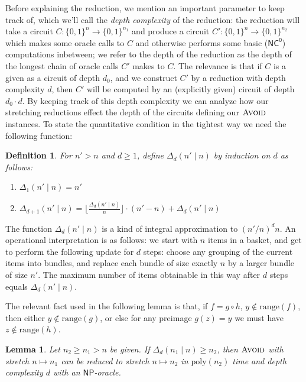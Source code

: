 \documentclass[11pt]{article}
\newtheorem{lemma}{Lemma}
\newtheorem{definition}{Definition}
\newcommand{\B}{\{0,1\}}
\newcommand{\poly}{\mathrm{poly}}
\newcommand{\avoid}{\textsc{Avoid}}
\begin{document}
Before explaining the reduction, we mention an important parameter to keep track of, which we'll call the \emph{depth complexity} of the reduction: the reduction will take a circuit $C: \B^n \to \B^{n_1}$ and produce a circuit $C': \B^n \to \B^{n_2}$ which makes some oracle calls to $C$ and otherwise performs some basic ($\mathsf{NC^0}$) computations inbetween; we refer to the depth of the reduction as the depth of the longest chain of oracle calls $C'$ makes to $C$. The relevance is that if $C$ is a given as a circuit of depth $d_0$, and we construct $C'$ by a reduction with depth complexity $d$, then $C'$ will be computed by an (explicitly given) circuit of depth $d_0 \cdot d$. By keeping track of this depth complexity we can analyze how our stretching reductions effect the depth of the circuits defining our $\avoid$ instances. To state the quantitative condition in the tightest way we need the following function:

\begin{definition}
For $n'>n$ and $d \geq 1$, define $\Delta_d(n'\mid n)$ by induction on $d$ as follows: 
\begin{enumerate}
	\item $\Delta_1(n' \mid n) = n'$
	\item $\Delta_{d+1}(n' \mid n) = \lfloor \frac{\Delta_{d}(n' \mid n)}{n}\rfloor \cdot (n'-n) +  \Delta_d(n' \mid n)  $
\end{enumerate}
\end{definition}

The function $\Delta_d(n' \mid n) $ is a kind of integral approximation to $ (n'/n)^d n$. An operational interpretation is as follows: we start with $n$ items in a basket, and get to perform the following update for $d$ steps: choose any grouping of the current items into bundles, and replace each bundle of size exactly $n$ by a larger bundle of size $n'$. The maximum number of items obtainable in this way after $d$ steps equals $\Delta_d(n' \mid n)$. 

The relevant fact used in the following lemma is that, if $f = g \circ h$, $y \notin \mathrm{range}(f)$, then either $y \notin \mathrm{range}(g)$, or else for any preimage $g(z)=y$ we must have $z \notin \mathrm{range}(h)$.
\begin{lemma}\label{lem:stretching}
Let $n_2\geq n_1>n$ be given. If $\Delta_d(n_1 \mid n) \geq n_2$,  then $\avoid$ with stretch $n \mapsto n_1$ can be reduced to stretch $n \mapsto n_2$ in $\poly(n_2)$ time and depth complexity $d$ with an $\mathsf{NP}$-oracle.
\end{lemma}
\end{document}
